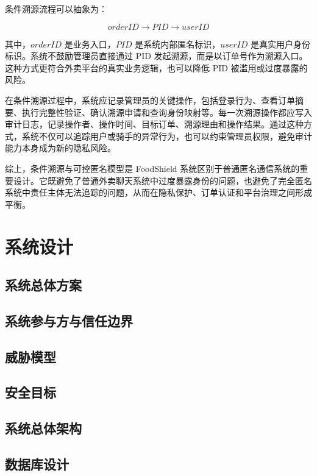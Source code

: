 \documentclass[UTF8,a4paper,zihao=-4,fontset=fandol]{ctexart}
\begin{document}
条件溯源流程可以抽象为：

\begin{equation}
orderID \rightarrow PID \rightarrow userID
\end{equation}

其中，$orderID$ 是业务入口，$PID$ 是系统内部匿名标识，$userID$ 是真实用户身份标识。系统不鼓励管理员直接通过 PID 发起溯源，而是以订单号作为溯源入口。这种方式更符合外卖平台的真实业务逻辑，也可以降低 PID 被滥用或过度暴露的风险。

在条件溯源过程中，系统应记录管理员的关键操作，包括登录行为、查看订单摘要、执行完整性验证、确认溯源申请和查询身份映射等。每一次溯源操作都应写入审计日志，记录操作者、操作时间、目标订单、溯源理由和操作结果。通过这种方式，系统不仅可以追踪用户或骑手的异常行为，也可以约束管理员权限，避免审计能力本身成为新的隐私风险。

综上，条件溯源与可控匿名模型是 FoodShield 系统区别于普通匿名通信系统的重要设计。它既避免了普通外卖聊天系统中过度暴露身份的问题，也避免了完全匿名系统中责任主体无法追踪的问题，从而在隐私保护、订单认证和平台治理之间形成平衡。


\newpage
\section{系统设计}
\subsection{系统总体方案}

\subsection{系统参与方与信任边界}

\subsection{威胁模型}

\subsection{安全目标}

\subsection{系统总体架构}

\subsection{数据库设计}
\end{document}

